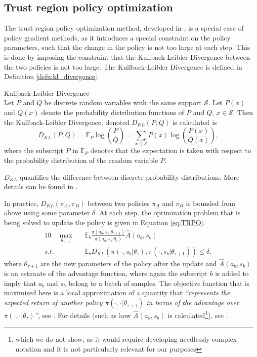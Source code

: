 \newpage
\subsection{Trust region policy optimization}
The trust region policy optimization method, developed in \cite{TRPO}, is a special case of policy gradient methods, as it introduces a special constraint on the policy parameters, such that the change in the policy is not too large at each step. This is done by imposing the constraint that the Kullback-Leibler Divergence between the two policies is not too large. The Kullback-Leibler Divergence is defined in Definition \ref{defn:kl_divergence}.
\begin{defn} \label{defn:kl_divergence}
{\normalfont Kullback-Leibler Divergence}
\\
Let $P$ and $Q$ be discrete random variables with the same support $\mathcal{S}$. Let $P(x)$ and $Q(x)$ denote the probability distribution functions of $P$ and $Q$, $x \in \mathcal{S}$. Then the Kullback-Leibler Divergence, denoted $D_{KL}(P,Q)$ is calculated is
\begin{equation*}
D_{KL}(P,Q) = \mathbb{E}_{P} \log(\frac{P}{Q}) = \sum_{x \in \mathcal{S}} P(x) \log(\frac{P(x)}{Q(x)}),	
\end{equation*}
where the subscript $P$ in $\mathbb{E}_{P}$ denotes that the expectation is taken with respect to the probability distribution of the random variable $P$.
\end{defn}
$D_{KL}$ quantifies the difference between discrete probability distributions. More details can be found in \cite{KL_divergence}.

In practice, $D_{KL}(\pi_{A},\pi_{B})$ between two policies $\pi_{A}$ and $\pi_{B}$ is bounded from above using some parameter $\delta$. At each step, the optimization problem that is being solved to update the policy is given in Equation \ref{eq:TRPO}.
\begin{alignat}{10}
&  \underset{\theta_{\tau+1}}{\max} \, && \mathbb{E}_b \frac{\pi(a_b, s_b|\theta_{\tau+1})}{\pi(a_b, s_b|\theta_{\tau})} \widehat{A}(a_b, s_b) \label{eq:TRPO} \\
s.t. & && \mathbb{E}_b D_{KL}(\pi(\cdot, s_b|\theta_{\tau}), \pi(\cdot, s_b|\theta_{\tau+1})) \leq \delta \nonumber,
\end{alignat}
where $\theta_{\tau+1}$ are the new parameters of the policy after the update and $\widehat{A}(a_b, s_b)$ is an estimate of the advantage function, where again the subscript $b$ is added to imply that $a_b$ and $s_b$ belong to a batch of samples.
The objective function that is maximised here is a local approximation of a quantity that \textit{“represents the expected return
of another policy $\pi(\cdot,\cdot|\theta_{\tau+1})$ in terms of the advantage over $\pi(\cdot,\cdot|\theta_{\tau})$”}, see \cite[Equation 1]{TRPO}. For details (such as how $\widehat{A}(a_b, s_b)$ is calculated\footnote{which we do not show, as it would require developing needlessly complex notation and it is not particularly relevant for our purposes}), see \cite[Section 2-4]{TRPO}.

